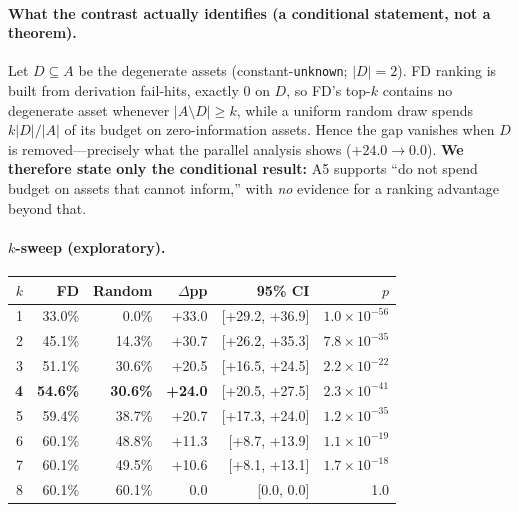 \paragraph{What the contrast actually identifies (a conditional statement, not a theorem).}
Let $D\subseteq A$ be the degenerate assets (constant-\texttt{unknown}; $|D|{=}2$). FD ranking is
built from derivation fail-hits, exactly $0$ on $D$, so FD's top-$k$ contains no degenerate asset
whenever $|A\setminus D|\ge k$, while a uniform random draw spends $k|D|/|A|$ of its budget on
zero-information assets. Hence the gap vanishes when $D$ is removed---precisely what the parallel
analysis shows ($+24.0\to0.0$). \textbf{We therefore state only the conditional result:} A5 supports
``do not spend budget on assets that cannot inform,'' with \emph{no} evidence for a ranking
advantage beyond that.

\paragraph{$k$-sweep (exploratory).}
\begin{center}\footnotesize
\begin{tabular}{@{}rrrrrr@{}}
\toprule
$k$ & FD & Random & $\Delta$pp & 95\% CI & $p$ \\
\midrule
1 & 33.0\% & 0.0\% & +33.0 & [+29.2, +36.9] & $1.0\times10^{-56}$ \\
2 & 45.1\% & 14.3\% & +30.7 & [+26.2, +35.3] & $7.8\times10^{-35}$ \\
3 & 51.1\% & 30.6\% & +20.5 & [+16.5, +24.5] & $2.2\times10^{-22}$ \\
\textbf{4} & \textbf{54.6\%} & \textbf{30.6\%} & \textbf{+24.0} & [+20.5, +27.5] & $2.3\times10^{-41}$ \\
5 & 59.4\% & 38.7\% & +20.7 & [+17.3, +24.0] & $1.2\times10^{-35}$ \\
6 & 60.1\% & 48.8\% & +11.3 & [+8.7, +13.9] & $1.1\times10^{-19}$ \\
7 & 60.1\% & 49.5\% & +10.6 & [+8.1, +13.1] & $1.7\times10^{-18}$ \\
8 & 60.1\% & 60.1\% & 0.0 & [0.0, 0.0] & 1.0 \\
\bottomrule
\end{tabular}
\end{center}

